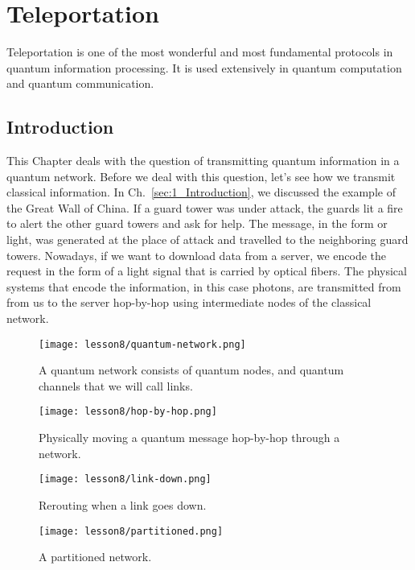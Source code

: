 \chapter{Teleportation}
\label{sec:8_teleportation}

Teleportation is one of the most wonderful and most fundamental protocols in quantum information processing.
It is used extensively in quantum computation and quantum communication.

\section{Introduction}
\label{sec:8-1_introduction}

This Chapter deals with the question of transmitting quantum information in a quantum network.
Before we deal with this question, let's see how we transmit classical information.
In Ch.~\ref{sec:1_Introduction}, we discussed the example of the Great Wall of China.
If a guard tower was under attack, the guards lit a fire to alert the other guard towers and ask for help.
The message, in the form or light, was generated at the place of attack and travelled to the neighboring guard towers.
Nowadays, if we want to download data from a server, we encode the request in the form of a light signal that is carried by optical fibers.
The physical systems that encode the information, in this case photons, are transmitted from from us to the server hop-by-hop using intermediate nodes of the classical network.
\begin{figure}[H]
    \centering
    \texttt{[image: lesson8/quantum-network.png]}
        \caption[A quantum network of nodes and channels.]{A quantum network consists of quantum nodes, and quantum channels that we will call links.}
    \label{fig:quantum-network}
\end{figure}
\begin{figure}[H]
    \centering
    \texttt{[image: lesson8/hop-by-hop.png]}
        \caption[Hop-by-hop transmission.]{Physically moving a quantum message hop-by-hop through a network.}
    \label{fig:hop-by-hop}
\end{figure}
\begin{figure}[H]
    \centering
    \texttt{[image: lesson8/link-down.png]}
        \caption{Rerouting when a link goes down.}
    \label{fig:link-down}
\end{figure}
\begin{figure}[H]
    \centering
    \texttt{[image: lesson8/partitioned.png]}
        \caption{A partitioned network.}
    \label{fig:partition}
\end{figure}

